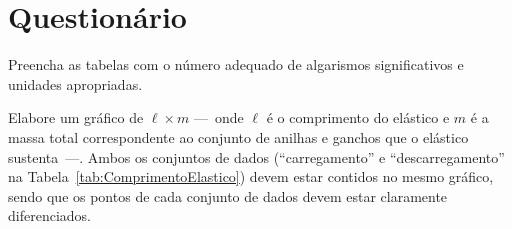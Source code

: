 \cleardoublepage


\vspace{15mm}

\begin{fullwidth}
\noindent{}
\vspace{5mm}

\noindent{}

\noindent{}

\noindent{}

\noindent{}

\noindent{}
\end{fullwidth}

\vspace{5mm}

\section{Questionário}

\begin{question}[type={exam}]{2}
Preencha as tabelas com o número adequado de algarismos significativos e unidades apropriadas. 
\end{question}

\begin{question}[type={exam}]{3}
Elabore um gráfico de $\ell \times m$ ---~onde $\ell$ é o comprimento do elástico e $m$ é a massa total correspondente ao conjunto de anilhas e ganchos que o elástico sustenta~---. Ambos os conjuntos de dados (``carregamento'' e ``descarregamento'' na Tabela~\ref{tab:ComprimentoElastico}) devem estar contidos no mesmo gráfico, sendo que os pontos de cada conjunto de dados devem estar claramente diferenciados.
\end{question}

